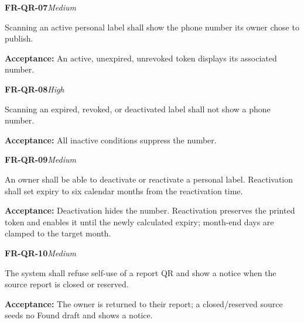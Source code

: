 \documentclass[12pt,a4paper,oneside]{report}
\begin{document}
\noindent\begin{minipage}{\linewidth}\textbf{FR-QR-07}\hfill\textit{Medium}\par\nopagebreak

Scanning an active personal label shall show the phone number its owner chose to publish.

{\color{muted}\textbf{Acceptance:} An active, unexpired, unrevoked token displays its associated number.\par}\end{minipage}\par\vspace{5pt}

\noindent\begin{minipage}{\linewidth}\textbf{FR-QR-08}\hfill\textit{High}\par\nopagebreak

Scanning an expired, revoked, or deactivated label shall not show a phone number.

{\color{muted}\textbf{Acceptance:} All inactive conditions suppress the number.\par}\end{minipage}\par\vspace{5pt}

\noindent\begin{minipage}{\linewidth}\textbf{FR-QR-09}\hfill\textit{Medium}\par\nopagebreak

An owner shall be able to deactivate or reactivate a personal label. Reactivation shall set expiry to six calendar months from the reactivation time.

{\color{muted}\textbf{Acceptance:} Deactivation hides the number. Reactivation preserves the printed token and enables it until the newly calculated expiry; month-end days are clamped to the target month.\par}\end{minipage}\par\vspace{5pt}

\noindent\begin{minipage}{\linewidth}\textbf{FR-QR-10}\hfill\textit{Medium}\par\nopagebreak

The system shall refuse self-use of a report QR and show a notice when the source report is closed or reserved.

{\color{muted}\textbf{Acceptance:} The owner is returned to their report; a closed/reserved source seeds no Found draft and shows a notice.\par}\end{minipage}\par\vspace{5pt}
\end{document}
